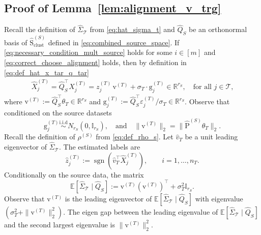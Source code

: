 \documentclass[10pt]{article}
\newcommand{\R}{\mathbb R}
\newcommand{\Ebb}{\mathbb E}
\newcommand{\simiid}{\overset{\mathrm{i.i.d}}{\sim}}
\newcommand{\Id}{\mathbb I}
\newcommand{\wh}{\widehat}
\newcommand{\calT}{\mathcal T}
\newcommand{\trg}{T}
\newcommand{\thetaT}{\theta_{\trg}}
\newcommand{\nT}{n_{\trg}}
\newcommand{\sigmaT}{\sigma_{\trg}}
\newcommand{\Xtar}{X^{(\trg)}}
\newcommand{\ztar}{z^{(\trg)}}
\newcommand{\hatztar}{\wh{z}^{(\trg)}}
\newcommand{\rmqv}{\mathrm{v}^{(\trg)}}
\newcommand{\rmqg}{\mathrm{g}^{(\trg)}}
\newcommand{\src}{S}
\newcommand{\spclust}{\wh{\mathrm{S}}_{\mathrm{clust}}}
\begin{document}
\subsection{Proof of Lemma~\ref{lem:alignment_v_trg}}
Recall the definition of $\wh{\Sigma}_{\calT}$ from \eqref{eq:hat_sigma_t} and $\wh Q_\src$ be an orthonormal basis of $\spclust^{(\src)}$ defined in \eqref{eq:combined_source_space}. If \eqref{eq:necessary_condition_mult_source} holds for some $i \in [m]$ and \eqref{eq:correct_choose_alignment} holds, then by definition in \eqref{eq:def_hat_x_tar_q_tar}
\begin{align}
    \wh X^{(\trg)}_j = \wh Q^\top_\src \Xtar_j= \ztar_j\,\rmqv+\sigmaT\cdot\rmqg_j \in \R^{r_\src}, \quad \mbox{for all $j \in \calT$,}
\end{align}
where $\rmqv:=\wh Q^\top_\src\thetaT \in \R^{r_\src}$ and $\rmqg_j:=\wh Q^\top_\src\varepsilon^{(\trg)}_j/\sigmaT \in \R^{r_\src}$.
Observe that conditioned on the source datasets 
\[
\rmqg_j \simiid N_{r_\src}(0,\Id_{r_\src}), \quad \mbox{and} \quad \|\rmqv\|_2=\|\wh{\mathrm P}^{(\src)}\thetaT\|_2.
\]
Recall the definition of $\rho^{(\src)}$ from \eqref{eq:def_rho_s}. Let $\wh v_\trg$ be a unit leading eigenvector of $\wh\Sigma_{\calT}$. The estimated labels are
\[
\hatztar_j:=\operatorname{sgn}(\wh v^\top_\trg \wh X^{(\trg)}_j), \qquad i=1,\ldots,\nT.
\]
Conditionally on the source data, the matrix
\[
\Ebb[\wh\Sigma_{\calT}\mid\wh Q_\src]:= \rmqv(\rmqv)^\top+\sigmaT^2\Id_{r_\src}.
\]
Observe that $\rmqv$ is the leading eigenvector of $\Ebb[\wh\Sigma_{\calT}\mid\wh Q_\src]$ with eigenvalue $(\sigmaT^2+\|\rmqv\|^2_2)$. The eigen gap between the leading eigenvalue of $\Ebb[\wh\Sigma_{\calT}\mid\wh Q_\src]$ and the second largest eigenvalue is $\|\rmqv\|^2_2$.
\end{document}
